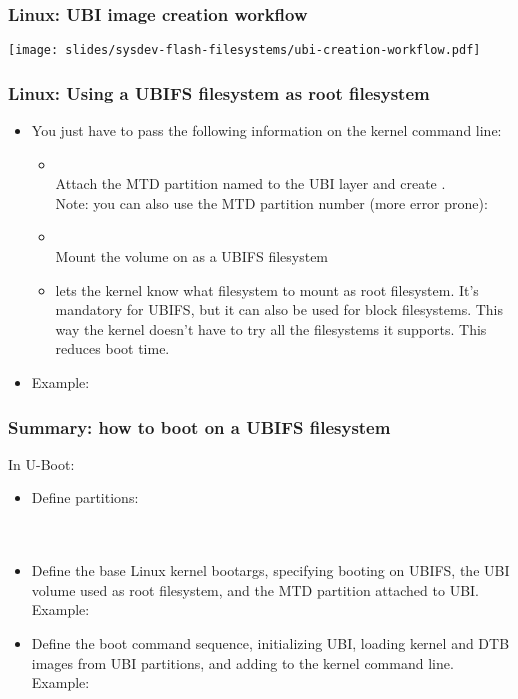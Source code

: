\begin{frame}
  \frametitle{Linux: UBI image creation workflow}
  \begin{center}
    \texttt{[image: slides/sysdev-flash-filesystems/ubi-creation-workflow.pdf]}
  \end{center}
\end{frame}

\begin{frame}
  \frametitle{Linux: Using a UBIFS filesystem as root filesystem}
  \begin{itemize}
  \item You just have to pass the following information on the kernel
    command line:
    \begin{itemize}
    \item {}\\
      Attach the MTD partition named  to the UBI layer and
      create .\\
      Note: you can also use the MTD partition number (more error
      prone): 
    \item {}\\
      Mount the  volume on  as a UBIFS filesystem
    \item {} lets the kernel know what filesystem
      to mount as root filesystem. It's mandatory for UBIFS, but
      it can also be used for block filesystems. This way the kernel
      doesn't have to try all the filesystems it supports. This reduces
      boot time.
    \end{itemize}
  \item Example: 
  \end{itemize}
\end{frame}

\begin{frame}
  \frametitle{Summary: how to boot on a UBIFS filesystem}
  In U-Boot:
  \begin{itemize}
  \item Define partitions:\\
     \\
     \\
  \item Define the base Linux kernel bootargs, specifying booting
     on UBIFS, the UBI volume used as root filesystem, and the MTD
     partition attached to UBI. Example:\\
     {\footnotesize {}}
  \item Define the boot command sequence, initializing UBI,
     loading kernel and DTB images from UBI partitions,
     and adding  to the kernel command
     line. Example:\\
  \end{itemize}
\end{frame}

